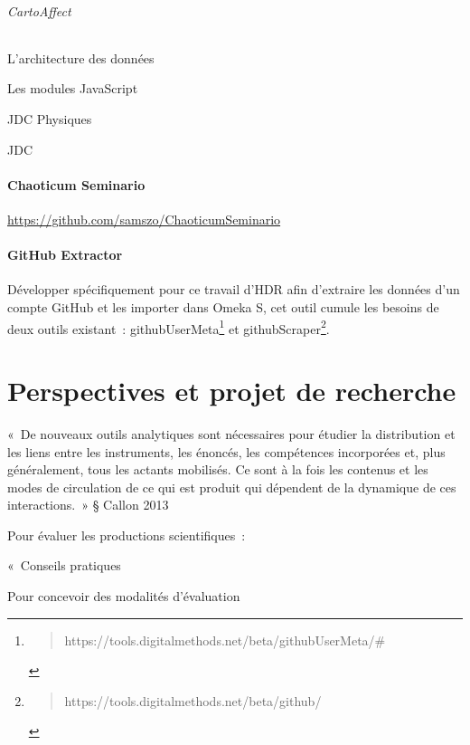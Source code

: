 \documentclass[
  a4paper,
  DIV=11,
  numbers=noendperiod]{scrreprt}
\let\oldparagraph\paragraph
\renewcommand{\paragraph}[1]{\oldparagraph{#1}\mbox{}}
\let\oldsubparagraph\subparagraph
\renewcommand{\subparagraph}[1]{\oldsubparagraph{#1}\mbox{}}
\begin{document}
\paragraph{CartoAffect}\label{sec-cartoAffect}

\subparagraph{L'architecture des
données}\label{larchitecture-des-donnuxe9es}

\subparagraph{Les modules JavaScript}\label{les-modules-javascript}

JDC Physiques

JDC

\subsection{Chaoticum Seminario}\label{sec-chaoticumSeminario}

\url{https://github.com/samszo/ChaoticumSeminario}

\subsection{GitHub Extractor}\label{github-extractor}

Développer spécifiquement pour ce travail d'HDR afin d'extraire les
données d'un compte GitHub et les importer dans Omeka S, cet outil
cumule les besoins de deux outils existant~: githubUserMeta\footnote{\begin{quote}
  https://tools.digitalmethods.net/beta/githubUserMeta/\#
  \end{quote}} et githubScraper\footnote{\begin{quote}
  https://tools.digitalmethods.net/beta/github/
  \end{quote}}.

\part{Perspectives et projet de recherche}

«~De nouveaux outils analytiques sont nécessaires pour étudier la
distribution et les liens entre les instruments, les énoncés, les
compétences incorporées et, plus généralement, tous les actants
mobilisés. Ce sont à la fois les contenus et les modes de circulation de
ce qui est produit qui dépendent de la dynamique de ces interactions.~»
§ Callon 2013

Pour évaluer les productions scientifiques~:

«~Conseils pratiques

Pour concevoir des modalités d'évaluation
\end{document}
